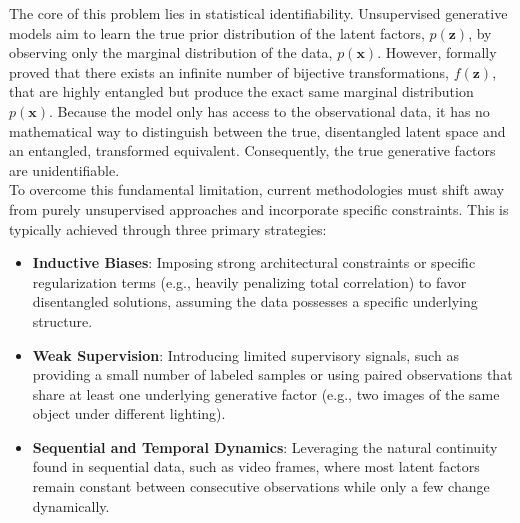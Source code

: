 The core of this problem lies in statistical identifiability. Unsupervised generative models aim to learn the true prior distribution of the latent factors, $p(\mathbf{z})$, by observing only the marginal distribution of the data, $p(\mathbf{x})$. However, \cite{locatello2019challengingcommonassumptionsunsupervised} formally proved that there exists an infinite number of bijective transformations, $f(\mathbf{z})$, that are highly entangled but produce the exact same marginal distribution $p(\mathbf{x})$. Because the model only has access to the observational data, it has no mathematical way to distinguish between the true, disentangled latent space and an entangled, transformed equivalent. Consequently, the true generative factors are unidentifiable. \\
To overcome this fundamental limitation, current methodologies must shift away from purely unsupervised approaches and incorporate specific constraints. This is typically achieved through three primary strategies:
\begin{itemize}
    \item \textbf{Inductive Biases}: Imposing strong architectural constraints or specific regularization terms (e.g., heavily penalizing total correlation) to favor disentangled solutions, assuming the data possesses a specific underlying structure.
    \item \textbf{Weak Supervision}: Introducing limited supervisory signals, such as providing a small number of labeled samples or using paired observations that share at least one underlying generative factor (e.g., two images of the same object under different lighting). 
    \item \textbf{Sequential and Temporal Dynamics}: Leveraging the natural continuity found in sequential data, such as video frames, where most latent factors remain constant between consecutive observations while only a few change dynamically.
\end{itemize}


